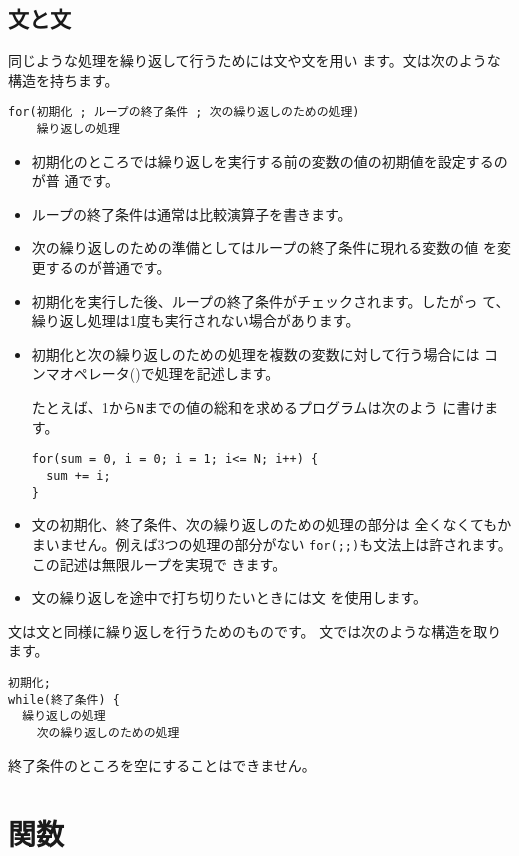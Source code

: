 \subsection{\protect{}文と\protect{}文}
同じような処理を繰り返して行うためには文や文を用い
ます。文は次のような構造を持ちます。
\begin{verbatim}
for(初期化 ; ループの終了条件 ; 次の繰り返しのための処理)
	繰り返しの処理
\end{verbatim}
\begin{itemize}
 \item 初期化のところでは繰り返しを実行する前の変数の値の初期値を設定するのが普
通です。
 \item ループの終了条件は通常は比較演算子を書きます。 
 \item 次の繰り返しのための準備としてはループの終了条件に現れる変数の値
			 を変更するのが普通です。
 \item 初期化を実行した後、ループの終了条件がチェックされます。したがっ
			 て、繰り返し処理は1度も実行されない場合があります。
 \item 初期化と次の繰り返しのための処理を複数の変数に対して行う場合には
			 コンマオペレータ(\ElmJ{,})で処理を記述します。

			 たとえば、1から\verb+N+までの値の総和を求めるプログラムは次のよう
			 に書けます。
\begin{verbatim}
for(sum = 0, i = 0; i = 1; i<= N; i++) {
  sum += i;
}
\end{verbatim}
 \item {}文の初期化、終了条件、次の繰り返しのための処理の部分は
			 全くなくてもかまいません。例えば3つの処理の部分がない
			 \verb+for(;;)+も文法上は許されます。この記述は無限ループを実現で
			 きます。
 \item {}文の繰り返しを途中で打ち切りたいときには文
			 を使用します。
\end{itemize}
文は文と同様に繰り返しを行うためのものです。
文では次のような構造を取ります。
\begin{verbatim}
初期化;
while(終了条件) {
  繰り返しの処理
	次の繰り返しのための処理
\end{verbatim}
終了条件のところを空にすることはできません。

\section{関数}
